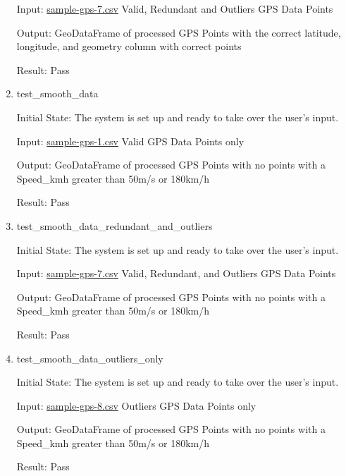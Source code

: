 \documentclass[12pt, titlepage]{article}
\begin{document}
\begin{enumerate}
    Input: \href{https://github.com/paezha/PyERT-BLACK/blob/rev0-test/quarto-example/data/sample-gps/sample-gps-7.csv}{sample-gps-7.csv} Valid, Redundant and Outliers GPS Data Points 
    
    Output: GeoDataFrame of processed GPS Points with the correct latitude, longitude, and geometry column with correct points
    
    Result: Pass

    \item{test\_smooth\_data} \label{test_smooth_data}
    
    Initial State: The system is set up and ready to take over the user’s input.

    Input: \href{https://github.com/paezha/PyERT-BLACK/blob/rev0-test/quarto-example/data/sample-gps/sample-gps-1.csv}{sample-gps-1.csv} Valid GPS Data Points only
    
    Output: GeoDataFrame of processed GPS Points with no points with a Speed\_kmh greater than 50m/s or 180km/h
    
    Result: Pass

    \item{test\_smooth\_data\_redundant\_and\_outliers} \label{test_smooth_data_redundant_and_outliers}
    
    Initial State: The system is set up and ready to take over the user’s input.

    Input: \href{https://github.com/paezha/PyERT-BLACK/blob/rev0-test/quarto-example/data/sample-gps/sample-gps-7.csv}{sample-gps-7.csv} Valid, Redundant, and Outliers GPS Data Points 
    
    Output: GeoDataFrame of processed GPS Points with no points with a Speed\_kmh greater than 50m/s or 180km/h
    
    Result: Pass

    \item{test\_smooth\_data\_outliers\_only} \label{test_smooth_data_outliers_only}
    
    Initial State: The system is set up and ready to take over the user’s input.

    Input: \href{https://github.com/paezha/PyERT-BLACK/blob/rev0-test/quarto-example/data/sample-gps/sample-gps-8.csv}{sample-gps-8.csv} Outliers GPS Data Points only
    
    Output: GeoDataFrame of processed GPS Points with no points with a Speed\_kmh greater than 50m/s or 180km/h
    
    Result: Pass
\end{enumerate}
\end{document}
